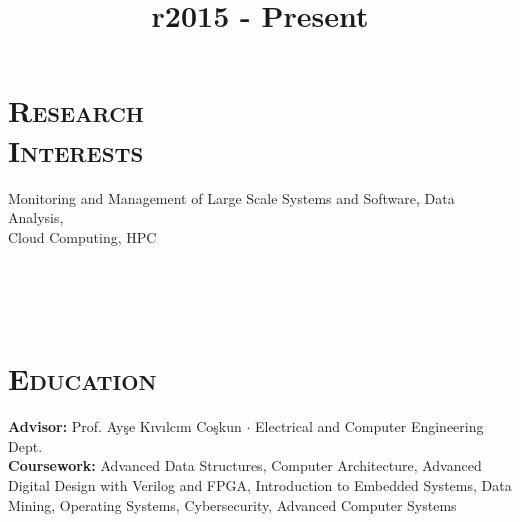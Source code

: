 
\hypersetup{backref,pdfpagemode=Full,colorlinks=true,backref}

\addtolength{\oddsidemargin}{-0.45in}
\addtolength{\voffset}{-0.30in}
\addtolength{\textwidth}{1.00in} \addtolength{\textheight}{1.50in}

\renewcommand{\namefont}{\LARGE\emph}

\def\Cplusplus{{\rm C\raise.25ex\hbox{\small ++}}}




\address{
}
\address{
	+1 857 540 8435 \hphantom{Apt. 2 Brookline M}
  \href{mailto:ates@bu.edu}{ates@bu.edu} 
}

\begin{resume}

  \vspace{-.5cm}
	
	\section{\textsc{Research\\Interests}}
	Monitoring and Management of Large Scale Systems and Software, Data Analysis,\\
  Cloud Computing, HPC 
	
	\begin{formatb}
		\title{r}\\
		\\
		\body\\
	\end{formatb}
	
	\section{\textsc{Education}}
	
	\title{2015 - Present}
	\begin{position}
		\textbf{Advisor:} Prof. Ay\c{s}e K{\i}v{\i}lc{\i}m Co\c{s}kun $\cdot$
    Electrical and Computer Engineering Dept. \\
    \textbf{Coursework:} Advanced Data Structures, Computer Architecture,
    Advanced Digital Design with Verilog and FPGA, Introduction to Embedded
    Systems, Data Mining, Operating Systems, Cybersecurity, Advanced Computer
    Systems
	\end{position}
	

\end{resume}
